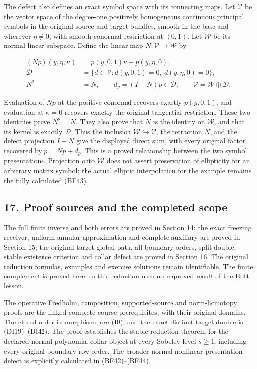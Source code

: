 \documentclass[
  11pt,
]{article}
\begin{document}
The defect also defines an exact symbol space with its connecting maps.
Let \(\mathcal V\) be the vector space of the degree-one positively
homogeneous continuous principal symbols in the original source and
target bundles, smooth in the base and wherever \(\eta\ne0\), with
smooth conormal restriction at \((0,1)\). Let \(\mathcal W\) be its
normal-linear subspace. Define the linear map
\(N:\mathcal V\to\mathcal W\) by

\[
 \begin{split}
 (Np)(y,\eta,\kappa)&=p(y,0,1)\kappa+p(y,\eta,0),\\
 \mathcal D&=\{d\in\mathcal V:d(y,0,1)=0,\ d(y,\eta,0)=0\},\\
 N^2&=N,\qquad d_p=(I-N)p\in\mathcal D,\qquad
 \mathcal V=\mathcal W\oplus\mathcal D.
 \end{split}
 \tag{BF44}
\]

Evaluation of \(Np\) at the positive conormal recovers exactly
\(p(y,0,1)\), and evaluation at \(\kappa=0\) recovers exactly the
original tangential restriction. These two identities prove \(N^2=N\).
They also prove that \(N\) is the identity on \(\mathcal W\), and that
its kernel is exactly \(\mathcal D\). Thus the inclusion
\(\mathcal W\hookrightarrow\mathcal V\), the retraction \(N\), and the
defect projection \(I-N\) give the displayed direct sum, with every
original factor recovered by \(p=Np+d_p\). This is a proved relationship
between the two symbol presentations. Projection onto \(\mathcal W\)
does not assert preservation of ellipticity for an arbitrary matrix
symbol; the actual elliptic interpolation for the example remains the
fully calculated (BF43).

\subsection{17. Proof sources and the completed
scope}\label{proof-sources-and-the-completed-scope}

The full finite inverse and both errors are proved in Section 14; the
exact freezing receiver, uniform annular approximation and complete
auxiliary are proved in Section 15; the original-target global path, all
boundary orders, split double, stable existence criterion and collar
defect are proved in Section 16. The original reduction formulas,
examples and exercise solutions remain identifiable. The finite
complement is proved here, so this reduction uses no unproved result of
the Bott lesson.

The operative Fredholm, composition, supported-source and norm-homotopy
proofs are the linked complete course prerequisites, with their original
domains. The closed order isomorphisms are (I9), and the exact
distinct-target double is (DI19)--(DI42). The proof establishes the
stable reduction theorem for the declared normal-polynomial collar
object at every Sobolev level \(s\ge1\), including every original
boundary row order. The broader normal-nonlinear presentation defect is
explicitly calculated in (BF42)--(BF44).
\end{document}
